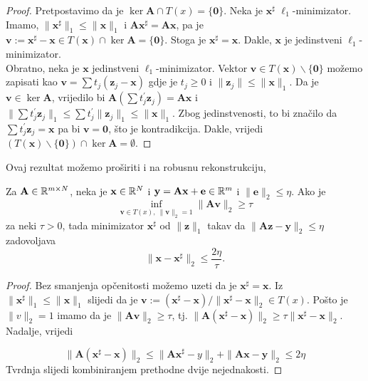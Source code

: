 \documentclass[a4paper,twoside,12pt]{memoir} %
\newcommand{\vect}[1]{\mathbf{#1}}
\renewcommand{\vec}{\vect}
\newcommand{\norm}[1]{\|{#1}\|}
\begin{document}
\begin{proof}
    Pretpostavimo da je $\ker \vec A \cap T(x) = \{\vec 0\}$. Neka je $\vec x^{\sharp}$ $\ell_1$-minimizator. Imamo, $\norm{\vec x^{\sharp}}_1 \leq \norm{\vec x}_1$ i $\vec A \vec x^{\sharp} = \vec{Ax}$, pa je $\vec v := \vec x^{\sharp} - \vec x \in T(\vec x) \cap \ker \vec A = \{\vec 0\}$. Stoga je $\vec x^{\sharp} = \vec x$. Dakle, $\vec x$ je jedinstveni $\ell_1$-minimizator.\\
    \indent
    Obratno, neka je $\vec x$ jedinstveni $\ell_1$-minimizator. Vektor $\vec v \in T(\vec x) \backslash \{\vec 0\}$ mo\v{z}emo zapisati kao $\vec v = \sum t_j (\vec z_j - \vec x)$ gdje je $t_j \geq 0$ i $\norm{\vec z_j} \leq \norm{\vec x}_1$. Da je $\vec v \in \ker \vec A$, vrijedilo bi $\vec A (\sum t_j^{'} \vec z_j) = \vec{Ax}$ i $\norm{\sum t_j^{'} \vec z_j}_1 \leq \sum t_j^{'} \norm{\vec z_j}_1 \leq \norm{\vec x}_1$. Zbog jedinstvenosti, to bi zna\v{c}ilo da $\sum t_j^{'} \vec z_j = \vec x$ pa bi $\vec v = \vec 0$, \v{s}to je kontradikcija. Dakle, vrijedi $(T(\vec x) \backslash \{\vec 0\}) \cap \ker \vec A = \emptyset$. 
\end{proof}
Ovaj rezultat mo\v{z}emo pro\v{s}iriti i na robusnu rekonstrukciju,
\begin{thm}
    Za $\vec A \in \R^{m \times N}$, neka je $\vec x \in \R^N$ i $\vec y = \vec{Ax} + \vec e \in \R^m$ i $\norm{\vec e}_2 \leq \eta$. Ako je
    \begin{equation*}
        \inf_{\vec v \in T(x),\ \norm{\vec v}_2 = 1} \norm{\vec{Av}}_2 \geq \tau
    \end{equation*}
    za neki $\tau > 0$, tada minimizator $\vec x^{\sharp}$ od $\norm{\vec z}_1$ takav da $\norm{\vec{Az} - \vec y}_2 \leq \eta$ zadovoljava
    \begin{equation}\label{4:35}
        \norm{\vec x - \vec x^{\sharp}}_2 \leq \frac{2 \eta}{\tau}. 
    \end{equation}
\end{thm}
\begin{proof}
    Bez smanjenja op\v{c}enitosti mo\v{z}emo uzeti da je $\vec x^{\sharp} = \vec x$. Iz $\norm{ \vec x^{\sharp}}_1 \leq \norm{\vec x}_1$ slijedi da je $\vec v := (\vec x^{\sharp} - \vec x)/ \norm{\vec x^{\sharp} - \vec x}_2 \in T(x)$. Po\v{s}to je $\norm{v}_2 = 1$ imamo da je $\norm{\vec{Av}}_2 \geq \tau$, tj. $\norm{\vec A (\vec x^{\sharp} - \vec x)}_2 \geq \tau \norm{\vec x^{\sharp} - \vec x}_2$. Nadalje, vrijedi
    
    \begin{equation*}
        \norm{\vec A (\vec x^{\sharp} - \vec x)}_2 \leq \norm{\vec{Ax}^{\sharp} - y}_2 + \norm{\vec{Ax} - \vec y}_2 \leq 2 \eta
    \end{equation*}
    Tvrdnja slijedi kombiniranjem prethodne dvije nejednakosti.
\end{proof}
\end{document}

